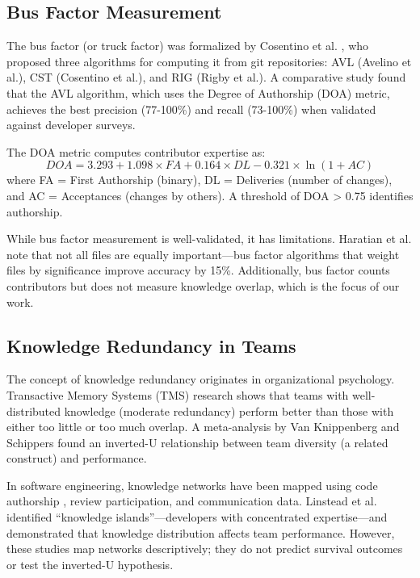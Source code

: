 \documentclass[11pt,letterpaper]{article}
\begin{document}
\subsection{Bus Factor Measurement}

The bus factor (or truck factor) was formalized by Cosentino et al. \cite{Cosentino2015}, who proposed three algorithms for computing it from git repositories: AVL (Avelino et al.), CST (Cosentino et al.), and RIG (Rigby et al.). A comparative study found that the AVL algorithm, which uses the Degree of Authorship (DOA) metric, achieves the best precision (77-100\%) and recall (73-100\%) when validated against developer surveys.

The DOA metric \cite{Avelino2016} computes contributor expertise as:
\[DOA = 3.293 + 1.098 \times FA + 0.164 \times DL - 0.321 \times \ln(1+AC)\]
where FA = First Authorship (binary), DL = Deliveries (number of changes), and AC = Acceptances (changes by others). A threshold of DOA > 0.75 identifies authorship.

While bus factor measurement is well-validated, it has limitations. Haratian et al. \cite{Haratian2023} note that not all files are equally important---bus factor algorithms that weight files by significance improve accuracy by 15\%. Additionally, bus factor counts contributors but does not measure knowledge overlap, which is the focus of our work.

\subsection{Knowledge Redundancy in Teams}

The concept of knowledge redundancy originates in organizational psychology. Transactive Memory Systems (TMS) research \cite{Cooke2000} shows that teams with well-distributed knowledge (moderate redundancy) perform better than those with either too little or too much overlap. A meta-analysis by Van Knippenberg and Schippers \cite{VanKnippenberg2007} found an inverted-U relationship between team diversity (a related construct) and performance.

In software engineering, knowledge networks have been mapped using code authorship \cite{Linstead2017}, review participation, and communication data. Linstead et al. \cite{Linstead2017} identified ``knowledge islands''---developers with concentrated expertise---and demonstrated that knowledge distribution affects team performance. However, these studies map networks descriptively; they do not predict survival outcomes or test the inverted-U hypothesis.
\end{document}
